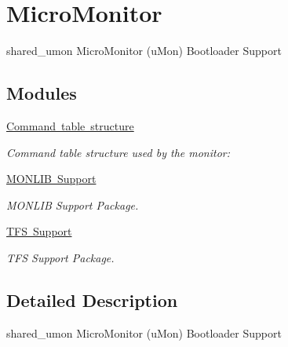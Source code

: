 \hypertarget{group__shared__umon}{}\section{Micro\+Monitor}
\label{group__shared__umon}


shared\+\_\+umon Micro\+Monitor (u\+Mon) Bootloader Support  


\subsection*{Modules}
\begin{DoxyCompactItemize}
\item 
\mbox{\hyperlink{group__shared__cli}{Command table structure}}
\begin{DoxyCompactList}\small\item\em Command table structure used by the monitor\+: \end{DoxyCompactList}\item 
\mbox{\hyperlink{group__shared__monlib}{M\+O\+N\+L\+I\+B Support}}
\begin{DoxyCompactList}\small\item\em M\+O\+N\+L\+IB Support Package. \end{DoxyCompactList}\item 
\mbox{\hyperlink{group__shared__tfs}{T\+F\+S Support}}
\begin{DoxyCompactList}\small\item\em T\+FS Support Package. \end{DoxyCompactList}\end{DoxyCompactItemize}


\subsection{Detailed Description}
shared\+\_\+umon Micro\+Monitor (u\+Mon) Bootloader Support 

